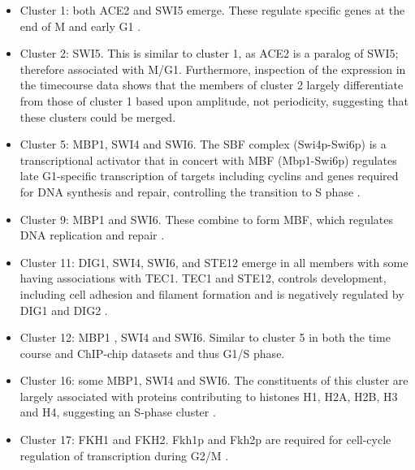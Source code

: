 \documentclass[]{article}
\begin{document}
\begin{itemize}
	\item Cluster 1: both ACE2 and SWI5 emerge. These regulate specific genes at the end of M and early G1 \citep{mcbride1999distinct, simon2001serial}.
	\item Cluster 2: SWI5. This is similar to cluster 1, as ACE2 is a paralog of SWI5; therefore associated with M/G1. Furthermore, inspection of the expression in the timecourse data shows that the members of cluster 2 largely differentiate from those of cluster 1 based upon amplitude, not periodicity, suggesting that these clusters could be merged.
	\item Cluster 5: MBP1, SWI4 and SWI6. The SBF complex (Swi4p-Swi6p) is a transcriptional activator that in concert with	MBF (Mbp1-Swi6p) regulates late G1-specific transcription of targets including cyclins and genes required for DNA synthesis and repair, controlling the transition to S phase \citep{simon2001serial,iyer2001genomic, aligianni2009fission}. 
	\item Cluster 9: MBP1 and SWI6. These combine to form MBF, which regulates DNA replication and repair \citep{iyer2001genomic}.
	\item Cluster 11: DIG1, SWI4, SWI6, and STE12 emerge in all members with some having associations with TEC1. TEC1 and STE12, controls development, including cell adhesion and filament formation and is negatively regulated by DIG1 and DIG2 \citep{van2014transcription}.
	\item Cluster 12: MBP1 , SWI4 and SWI6. Similar to cluster 5 in both the time course  and ChIP-chip datasets and thus G1/S phase.
	\item Cluster 16: some MBP1, SWI4 and SWI6. The constituents of this cluster are largely associated with proteins contributing to histones H1, H2A, H2B, H3 and H4, suggesting an S-phase cluster \citep{ewen2000cell}.
	\item Cluster 17: FKH1 and FKH2. Fkh1p and Fkh2p are required for cell-cycle regulation of transcription during G2/M \citep{kumar2000forkhead}. 

\end{itemize}
\end{document}
